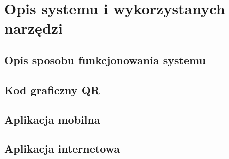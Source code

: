 \section{Opis systemu i wykorzystanych narzędzi}
\subsection{Opis sposobu funkcjonowania systemu}
\subsection{Kod graficzny QR}
\subsection{Aplikacja mobilna}
\subsection{Aplikacja internetowa}
